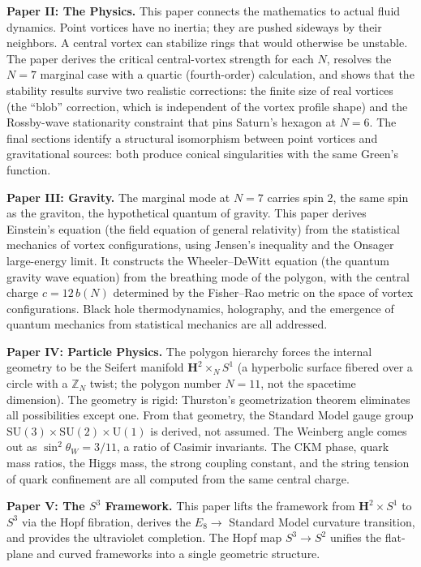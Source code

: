 \textbf{Paper II: The Physics.} This paper connects the mathematics
to actual fluid dynamics. Point vortices have no inertia; they are
pushed sideways by their neighbors. A central vortex can stabilize
rings that would otherwise be unstable. The paper derives the
critical central-vortex strength for each $N$, resolves the $N = 7$
marginal case with a quartic (fourth-order) calculation, and shows
that the stability results survive two realistic corrections: the
finite size of real vortices (the ``blob'' correction, which is
independent of the vortex profile shape) and the Rossby-wave
stationarity constraint that pins Saturn's hexagon at $N = 6$. The
final sections identify a structural isomorphism between point
vortices and gravitational sources: both produce conical
singularities with the same Green's function.

\textbf{Paper III: Gravity.} The marginal mode at $N = 7$ carries
spin 2, the same spin as the graviton, the hypothetical quantum of
gravity. This paper derives Einstein's equation (the field equation
of general relativity) from the statistical mechanics of vortex
configurations, using Jensen's inequality and the Onsager
large-energy limit. It constructs the Wheeler--DeWitt equation (the
quantum gravity wave equation) from the breathing mode of the
polygon, with the central charge $c = 12\,b(N)$ determined by the
Fisher--Rao metric on the space of vortex configurations. Black hole
thermodynamics, holography, and the emergence of quantum mechanics
from statistical mechanics are all addressed.

\textbf{Paper IV: Particle Physics.} The polygon hierarchy forces
the internal geometry to be the Seifert manifold
$\mathbf{H}^2 \times_N S^1$ (a hyperbolic surface
fibered over a circle with a $\mathbb{Z}_N$ twist;
the polygon number $N = 11$, not the spacetime dimension).
The geometry is rigid: Thurston's geometrization theorem eliminates
all possibilities except one. From that geometry, the Standard Model
gauge group $\mathrm{SU}(3) \times \mathrm{SU}(2) \times
\mathrm{U}(1)$ is derived, not assumed. The Weinberg angle comes
out as $\sin^2\theta_W = 3/11$, a ratio of Casimir invariants. The
CKM phase, quark mass ratios, the Higgs mass, the strong coupling
constant, and the string tension of quark confinement are all
computed from the same central charge.

\textbf{Paper V: The $S^3$ Framework.} This paper lifts the
framework from $\mathbf{H}^2 \times S^1$ to $S^3$ via the
Hopf fibration, derives the $E_8 \to$ Standard Model curvature
transition, and provides the ultraviolet completion.
The Hopf map $S^3 \to S^2$ unifies the flat-plane and curved
frameworks into a single geometric structure.

